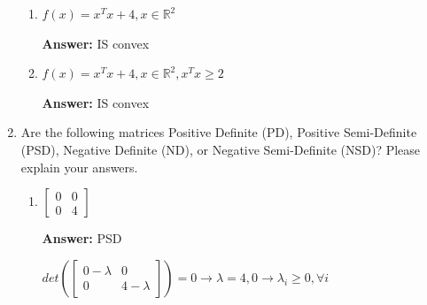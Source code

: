 \documentclass{assignment}
\newcommand{\R}{\mathbb{R}}
\begin{document}
\begin{problem}
\begin{enumerate}
\begin{enumerate}[label=(\alph*)]
        \item $f(x) = x^Tx + 4, x \in \R^2$

        \color{blue}\textbf{Answer:} IS convex\color{black}



        \item $f(x) = x^Tx + 4, x \in \R^2, x^Tx \geq 2$

        \color{blue}\textbf{Answer:} IS convex\color{black}


    \end{enumerate}

        
    \item Are the following matrices Positive Definite (PD), Positive Semi-Definite (PSD), Negative Definite (ND), or Negative Semi-Definite (NSD)? Please explain your answers.

    \begin{enumerate}[label=(\alph*)]


        
        \item $\begin{bmatrix}
            0 & 0\\
            0 & 4
        \end{bmatrix}$

        \color{blue}\textbf{Answer:} PSD
        
        $det(\begin{bmatrix}
            0 - \lambda & 0 \\
            0 & 4 - \lambda
        \end{bmatrix}) = 0 \rightarrow \lambda = 4, 0 \rightarrow \lambda_i \geq 0, \forall i$\color{black}



\end{enumerate}
\end{enumerate}
\end{problem}
\end{document}
